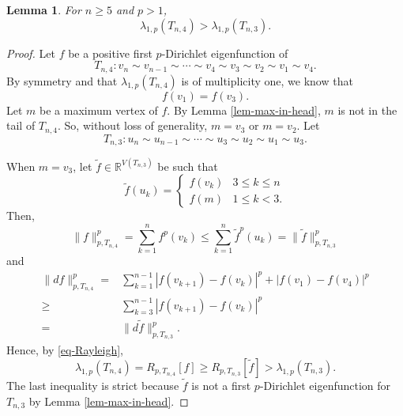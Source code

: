 \documentclass[10pt,a4paper]{amsart}
\newtheorem{lem}{Lemma}
\def\R{\mathbb{R}}
\def\wt{\widetilde}
\begin{document}
\begin{lem}\label{lem-comparison-tadpole}
For $n\geq 5$ and $p>1$,
$$\lambda_{1,p}(T_{n,4})>\lambda_{1,p}(T_{n,3}).$$
\end{lem}

\begin{proof}
Let $f$ be a positive first $p$-Dirichlet eigenfunction of
$$T_{n,4}: v_n\sim v_{n-1}\sim \cdots\sim v_4\sim v_3\sim v_2\sim v_1\sim v_4.$$
By symmetry and that $\lambda_{1,p}(T_{n,4})$ is of multiplicity one, we know that
\begin{equation}\label{eq-f-v1=v3}
f(v_1)=f(v_3).
\end{equation}
Let $m$ be a maximum vertex of $f$. By Lemma \ref{lem-max-in-head}, $m$ is not in the tail of $T_{n,4}$. So, without loss of generality, $m=v_3$ or $m=v_2$. Let
$$T_{n,3}: u_n\sim u_{n-1}\sim\cdots\sim u_{3}\sim u_2\sim u_1\sim u_3.$$

When $m=v_3$, let $\wt f\in \R^{V(T_{n,3})}$ be such that
\begin{equation*}
\wt f(u_k)=\left\{\begin{array}{ll}f(v_k)&3\leq k\leq n\\
f(m)&1\leq k<3.
\end{array}\right.
\end{equation*}
Then,
\begin{equation*}
\|f\|_{p,T_{n,4}}^p=\sum_{k=1}^nf^p(v_k)\leq \sum_{k=1}^n\wt f^p(u_k)=\|\wt f\|_{p,T_{n,3}}^p
\end{equation*}
and
\begin{equation*}
\begin{split}
\|df\|_{p,T_{n,4}}^p=&\sum_{k=1}^{n-1}|f(v_{k+1})-f(v_k)|^p+|f(v_1)-f(v_4)|^p\\
\geq&\sum_{k=3}^{n-1}|f(v_{k+1})-f(v_k)|^p\\
=&\|d\wt f\|_{p,T_{n,3}}^p.
\end{split}
\end{equation*}
Hence, by \eqref{eq-Rayleigh},
$$\lambda_{1,p}(T_{n,4})=R_{p,T_{n,4}}[f]\geq R_{p,T_{n,3}}[\wt f]>\lambda_{1,p}(T_{n,3}).$$
The last inequality is strict because $\wt f$ is not a first $p$-Dirichlet eigenfunction for $T_{n,3}$ by Lemma \ref{lem-max-in-head}.


\end{proof}
\end{document}
